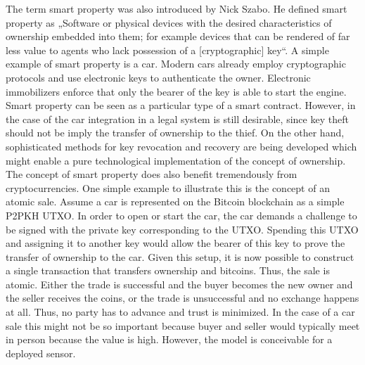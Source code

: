 The term smart property was also introduced by Nick Szabo. He defined smart property as „Software or physical devices with the desired characteristics of ownership embedded into them; for example devices that can be rendered of far less value to agents who lack possession of a [cryptographic] key“. A simple example of smart property is a car. Modern cars already employ cryptographic protocols and use electronic keys to authenticate the owner. Electronic immobilizers enforce that only the bearer of the key is able to start the engine. Smart property can be seen as a particular type of a smart contract. However, in the case of the car integration in a legal system is still desirable, since key theft should not be imply the transfer of ownership to the thief.  On the other hand, sophisticated methods for key revocation and recovery are being developed which might enable a pure technological implementation of the concept of ownership.
The concept of smart property does also benefit tremendously from cryptocurrencies. One simple example to illustrate this is the concept of an atomic sale. Assume a car is represented on the Bitcoin blockchain as a simple \ac{P2PKH} \ac{UTXO}. In order to open or start the car, the car demands a challenge to be signed with the private key corresponding to the \ac{UTXO}. Spending this \ac{UTXO} and assigning it to another key would allow the bearer of this key to prove the transfer of ownership to the car. Given this setup, it is now possible to construct a single transaction that transfers ownership and bitcoins. Thus, the sale is atomic. Either the trade is successful and the buyer becomes the new owner and the seller receives the coins, or the trade is unsuccessful and no exchange happens at all. Thus, no party has to advance and trust is minimized. In the case of a car sale this might not be so important because buyer and seller would typically meet in person because the value is high. However, the model is conceivable for a deployed sensor.


